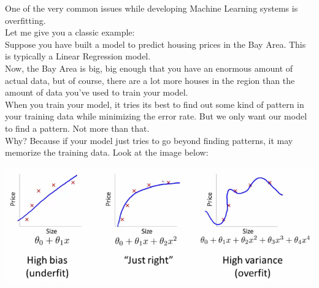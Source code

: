 \documentclass{42-en}
\begin{document}
One of the very common issues while developing Machine Learning systems is
overfitting.\\
Let me give you a classic example:\\
Suppose you have built a model to predict housing prices in the Bay Area. This is
typically a Linear Regression model.\\
Now, the Bay Area is big, big enough that you have an enormous amount of actual data, but of course, there are a lot more houses in the region than the amount of data you’ve used to train your model.\\
When you train your model, it tries its best to find out some kind of pattern in your training data while minimizing the error rate. But we only want our model to find a pattern. Not more than that.\\
Why? Because if your model just tries to go beyond finding patterns, it may memorize the training data. Look at the image below:\\

\centerline{\includegraphics[width=150mm]{images/bias_variance_typed.png}}
\end{document}
